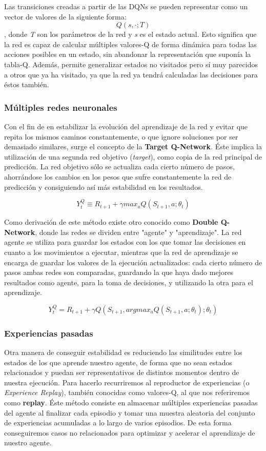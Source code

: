 Las transiciones creadas a partir de las DQNs se pueden representar como un vector de valores de la siguiente forma: $$Q(s, · ; T )$$, donde \textit{T} son los parámetros de la red y \textit{s} es el estado actual. Esto significa que la red es capaz de calcular múltiples valores-Q de forma dinámica para todas las acciones posibles en un estado, sin abandonar la representación que suponía la tabla-Q. Además, permite generalizar estados no visitados pero sí muy parecidos a otros que ya ha visitado, ya que la red ya tendrá calculadas las decisiones para éstos también.

\subsubsection{Múltiples redes neuronales}
Con el fin de en estabilizar la evolución del aprendizaje de la red y evitar que repita los mismos caminos constantemente, o que ignore soluciones por ser demasiado similares, surge el concepto de la \textbf{Target Q-Network}. Éste implica la utilización de una segunda red objetivo (\textit{target}), como copia de la red principal de predicción. La red objetivo sólo se actualiza cada cierto número de pasos, ahorrándose los cambios en los pesos que sufre constantemente la red de predicción y consiguiendo así más estabilidad en los resultados.

\begin{equation}
	Y^Q_{t} \equiv R_{t+1} + \gamma max_{a} Q(S_{t+1}, a; \theta_{t})
\end{equation}

Como derivación de este método existe otro conocido como \textbf{Double Q-Network}, donde las redes se dividen entre "agente" y "aprendizaje". La red agente se utiliza para guardar los estados con los que tomar las decisiones en cuanto a los movimientos a ejecutar, mientras que la red de aprendizaje se encarga de guardar los valores de la ejecución actualizados: cada cierto número de pasos ambas redes son comparadas, guardando la que haya dado mejores resultados como agente, para la toma de decisiones, y utilizando la otra para el aprendizaje.

\begin{equation}
	Y^Q_{t} = R_{t+1} + \gamma Q(S_{t+1}, argmax_{a} Q(S_{t+1}, a; \theta_{t}); \theta_{t})
\end{equation}

\subsubsection{Experiencias pasadas}
Otra manera de conseguir estabilidad es reduciendo las similitudes entre los estados de los que aprende nuestro agente, de forma que no sean estados relacionados y puedan ser representativos de distintos momentos dentro de nuestra ejecución. Para hacerlo recurriremos al reproductor de experiencias (o \textit{Experience Replay}), también conocidas como valores-Q, al que nos referiremos como \textbf{replay}. Éste método consiste en almacenar múltiples experiencias pasadas del agente al finalizar cada episodio y tomar una muestra aleatoria del conjunto de experiencias acumuladas a lo largo de varios episodios. De esta forma conseguiremos casos no relacionados para optimizar y acelerar el aprendizaje de nuestro agente.
